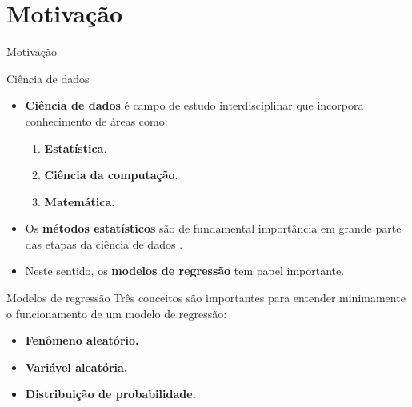 \documentclass[
  ignorenonframetext,
  serif,
  professionalfont,
  usenames,
  dvipsnames,
  aspectratio = 169]{beamer}
\begin{document}
\hypertarget{motivauxe7uxe3o}{%
\section{Motivação}\label{motivauxe7uxe3o}}

\begin{frame}{Motivação}
\end{frame}

\begin{frame}{Ciência de dados}
\protect\hypertarget{ciuxeancia-de-dados}{}
\begin{itemize}
    \itemsep 2ex
  
  \item \textbf{Ciência de dados} é campo de estudo interdisciplinar que incorpora conhecimento de áreas como:
  
  \begin{enumerate}
    \item \textbf{Estatística}.
    \item \textbf{Ciência da computação}.
    \item \textbf{Matemática}.
  \end{enumerate}

  \item Os \textbf{métodos estatísticos} são de fundamental importância em grande parte das etapas da ciência de dados \citep{weihs2018data}.
  
  \item Neste sentido, os \textbf{modelos de regressão} tem papel importante.
  
  \end{itemize}
\end{frame}

\begin{frame}{Modelos de regressão}
\protect\hypertarget{modelos-de-regressuxe3o}{}
Três conceitos são importantes para entender minimamente o funcionamento
de um modelo de regressão:

\begin{itemize}
  
  \itemsep 2ex
  
  \item \textbf{Fenômeno aleatório.}
  \item \textbf{Variável aleatória.}
  \item \textbf{Distribuição de probabilidade.}
\end{itemize}
\end{frame}
\end{document}
